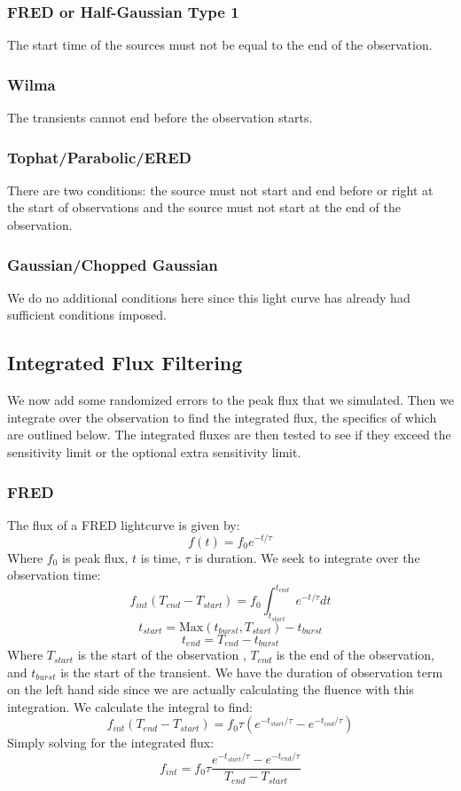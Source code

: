 \documentclass{article}
\begin{document}
\subsubsection{FRED or Half-Gaussian Type 1}
The start time of the sources must not be equal to the end of the observation.
\subsubsection{Wilma}
The transients cannot end before the observation starts.
\subsubsection{Tophat/Parabolic/ERED}
There are two conditions: the source must not start and end before or right at the start of observations and the source must not start at the end of the observation.
\subsubsection{Gaussian/Chopped Gaussian}
We do no additional conditions here since this light curve has already had sufficient conditions imposed.
\subsection{Integrated Flux Filtering}
We now add some randomized errors to the peak flux that we simulated. Then we integrate over the observation to find the integrated flux, the specifics of which are outlined below. The integrated fluxes are then tested to see if they exceed the sensitivity limit or the optional extra sensitivity limit. 
\subsubsection{FRED}
The flux of a FRED lightcurve is given by:
\[f(t)=f_0e^{-t/\tau}\]
Where $f_0$ is peak flux, $t$ is time, $\tau$ is duration. We seek to integrate over the observation time:
\[f_{int}(T_{end}-T_{start}) = f_0\int_{t_{start}}^{t_{end}}e^{-t/\tau}dt\]
\[t_{start} = \text{Max}(t_{burst}, T_{start}) - t_{burst}\]
\[t_{end} = T_{end} - t_{burst}\]
Where $T_{start}$ is the start  of the observation , $T_{end}$ is the end of the observation, and $t_{burst}$ is the start of the transient. We have the duration of observation term on the left hand side since we are actually calculating the fluence with this integration. We calculate the integral to find:
\[f_{int}(T_{end}-T_{start}) = f_0\tau (e^{-t_{start}/\tau}-e^{-t_{end}/\tau})\]
Simply solving for the integrated flux:
\[f_{int} = f_0\tau \frac{e^{-t_{start}/\tau}-e^{-t_{end}/\tau}}{T_{end}-T_{start}}\]
\end{document}
